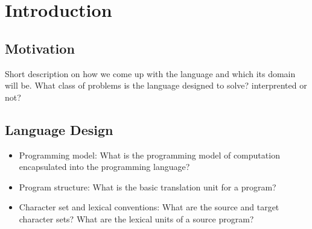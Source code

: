 \section{Introduction}
\label{sect:intro}
\subsection{Motivation}
Short description on how we come up with the language and which its
domain will be. What class of problems is the language designed to
solve? interprented or not?

\subsection{Language Design}
\begin{itemize}
\item Programming model: What is the programming model of
computation encapsulated into the programming language?
\item Program structure: What is the basic translation unit for a
program?
\item Character set and lexical conventions: What are the source
and target character sets? What are the lexical units of a source
program?
\end{itemize}
